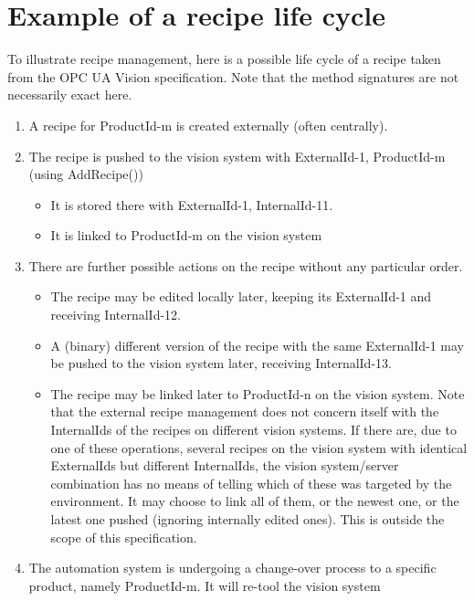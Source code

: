\appendix

\chapter{Example of a recipe life cycle}
To illustrate recipe management, here is a possible life cycle of a recipe taken from the OPC UA Vision specification. \cite{VDMA2018OPCSpecification} Note that the method signatures are not necessarily exact here. 
\begin{enumerate}
    \item A recipe for ProductId-m is created externally (often centrally). 
    \item The recipe is pushed to the vision system with ExternalId-1, ProductId-m (using AddRecipe())
    \begin{itemize}
        \item It is stored there with ExternalId-1, InternalId-11.
        \item It is linked to ProductId-m on the vision system
    \end{itemize}
    \item There are further possible actions on the recipe without any particular order.
    \begin{itemize}
        \item The recipe may be edited locally later, keeping its ExternalId-1 and receiving InternalId-12.
        \item A (binary) different version of the recipe with the same ExternalId-1 may be pushed to the vision system later, receiving InternalId-13.
        \item The recipe may be linked later to ProductId-n on the vision system. Note that the external recipe 
        management does not concern itself with the InternalIds of the recipes on different vision systems. If 
        there are, due to one of these operations, several recipes on the vision system with identical 
        ExternalIds but different InternalIds, the vision system/server combination has no means of telling 
        which of these was targeted by the environment. It may choose to link all of them, or the newest one, 
        or the latest one pushed (ignoring internally edited ones). This is outside the scope of this specification.
    \end{itemize}
    \item The automation system is undergoing a change-over process to a specific product, namely ProductId-m. It 
    will re-tool the vision system
    \begin{itemize}

\end{itemize}
\end{enumerate}
